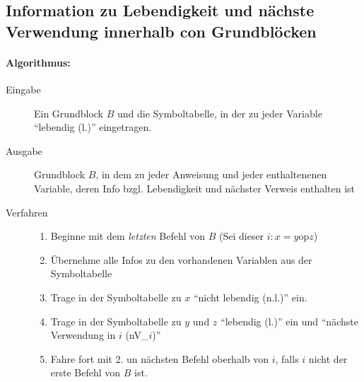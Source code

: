 \subsection{Information zu Lebendigkeit und nächste Verwendung innerhalb con Grundblöcken}
\paragraph{Algorithmus:} 
\begin{description}
 \item[Eingabe] Ein Grundblock $B$ und die Symboltabelle, in der zu jeder Variable "`lebendig (l.)"' eingetragen.
 \item[Ausgabe] Grundblock $B$, in dem zu jeder Anweisung und jeder enthaltenenen Variable, deren Info bzgl. Lebendigkeit und nächster Verweis enthalten ist
 \item[Verfahren]
     \begin{enumerate}
      \item Beginne mit dem \emph{letzten} Befehl von $B$ (Sei dieser $i{:} x = y \text{op} z$)
      \item Übernehme alle Infos zu den vorhandenen Variablen aus der Symboltabelle
      \item Trage in der Symboltabelle zu $x$ "`nicht lebendig (n.l.)"' ein.
      \item Trage in der Symboltabelle zu $y$ und $z$ "`lebendig (l.)"' ein und "`nächste Verwendung in $i$ (nV\_$i$)"'
      \item Fahre fort mit 2. un nächsten Befehl oberhalb von $i$, falls $i$ nicht der erste Befehl von $B$ ist.
     \end{enumerate}
\end{description}
